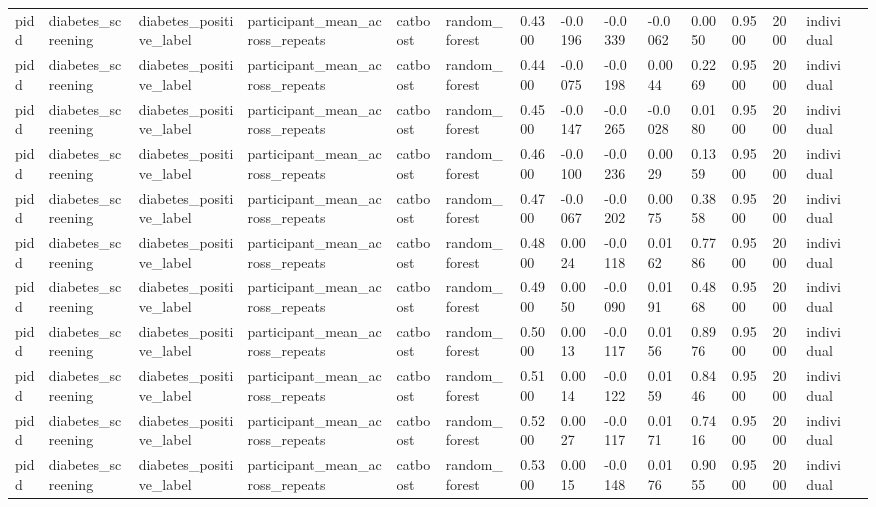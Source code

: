 \begin{tabular}{lllllllllllllll}
pidd & diabetes\_screening & diabetes\_positive\_label & participant\_mean\_across\_repeats & catboost & random\_forest & 0.4300 & -0.0196 & -0.0339 & -0.0062 & 0.0050 & 0.9500 & 2000 & individual &  \\
pidd & diabetes\_screening & diabetes\_positive\_label & participant\_mean\_across\_repeats & catboost & random\_forest & 0.4400 & -0.0075 & -0.0198 & 0.0044 & 0.2269 & 0.9500 & 2000 & individual &  \\
pidd & diabetes\_screening & diabetes\_positive\_label & participant\_mean\_across\_repeats & catboost & random\_forest & 0.4500 & -0.0147 & -0.0265 & -0.0028 & 0.0180 & 0.9500 & 2000 & individual &  \\
pidd & diabetes\_screening & diabetes\_positive\_label & participant\_mean\_across\_repeats & catboost & random\_forest & 0.4600 & -0.0100 & -0.0236 & 0.0029 & 0.1359 & 0.9500 & 2000 & individual &  \\
pidd & diabetes\_screening & diabetes\_positive\_label & participant\_mean\_across\_repeats & catboost & random\_forest & 0.4700 & -0.0067 & -0.0202 & 0.0075 & 0.3858 & 0.9500 & 2000 & individual &  \\
pidd & diabetes\_screening & diabetes\_positive\_label & participant\_mean\_across\_repeats & catboost & random\_forest & 0.4800 & 0.0024 & -0.0118 & 0.0162 & 0.7786 & 0.9500 & 2000 & individual &  \\
pidd & diabetes\_screening & diabetes\_positive\_label & participant\_mean\_across\_repeats & catboost & random\_forest & 0.4900 & 0.0050 & -0.0090 & 0.0191 & 0.4868 & 0.9500 & 2000 & individual &  \\
pidd & diabetes\_screening & diabetes\_positive\_label & participant\_mean\_across\_repeats & catboost & random\_forest & 0.5000 & 0.0013 & -0.0117 & 0.0156 & 0.8976 & 0.9500 & 2000 & individual &  \\
pidd & diabetes\_screening & diabetes\_positive\_label & participant\_mean\_across\_repeats & catboost & random\_forest & 0.5100 & 0.0014 & -0.0122 & 0.0159 & 0.8446 & 0.9500 & 2000 & individual &  \\
pidd & diabetes\_screening & diabetes\_positive\_label & participant\_mean\_across\_repeats & catboost & random\_forest & 0.5200 & 0.0027 & -0.0117 & 0.0171 & 0.7416 & 0.9500 & 2000 & individual &  \\
pidd & diabetes\_screening & diabetes\_positive\_label & participant\_mean\_across\_repeats & catboost & random\_forest & 0.5300 & 0.0015 & -0.0148 & 0.0176 & 0.9055 & 0.9500 & 2000 & individual &  \\

\end{tabular}
